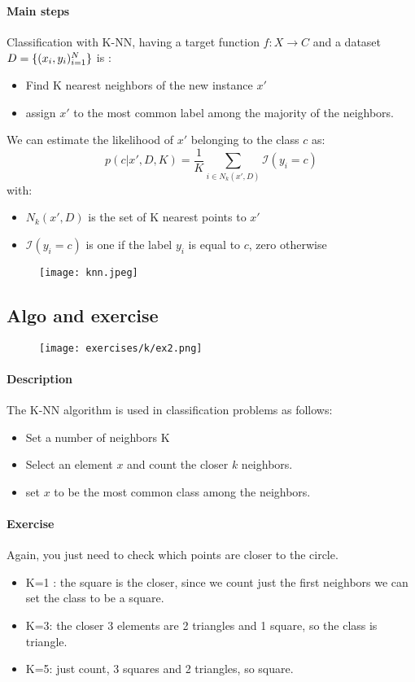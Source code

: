 \paragraph{Main steps}
Classification with K-NN, having a target function $f:X\rightarrow C$ and a dataset $D=\lbrace{(x_i,y_i)^N_{i=1}}\rbrace$ is :
\begin{itemize}
\item Find K nearest neighbors of the new instance $x'$
\item assign $x'$ to the most common label among the majority of the neighbors.
\end{itemize}
We can estimate the likelihood of $x'$ belonging to the class $c$ as:
$$p(c| x',D,K)=\frac{1}{K}\sum_{i \in N_k(x',D)}\mathcal{I}(y_i=c)$$
with:
\begin{itemize}
\item $ N_k(x',D)$ is the set of K nearest points to $x'$
\item $\mathcal{I}(y_i=c)$ is one if the label $y_i$ is equal to $c$, zero otherwise
\end{itemize}


\begin{figure}[H]
    \centering
    \texttt{[image: knn.jpeg]}
\end{figure}




\subsection{Algo and exercise}
    \begin{figure}[H]
     \centering
    \texttt{[image: exercises/k/ex2.png]}
\end{figure}

\paragraph{Description}
The K-NN algorithm is used in classification problems as follows:
\begin{itemize}
\item Set a number of neighbors K
\item Select an element $x$ and count the closer $k$ neighbors.
\item set $x$ to be the most common class among the neighbors.
\end{itemize}

\paragraph{Exercise}
Again, you just need to check which points are closer to the circle. 
\begin{itemize}
\item K=1 : the square is the closer, since we count just the first neighbors we can set the class to be a square.
\item K=3: the closer 3 elements are 2 triangles and 1 square, so the class is triangle.
\item K=5: just count, 3 squares and 2 triangles, so square.
\end{itemize}





